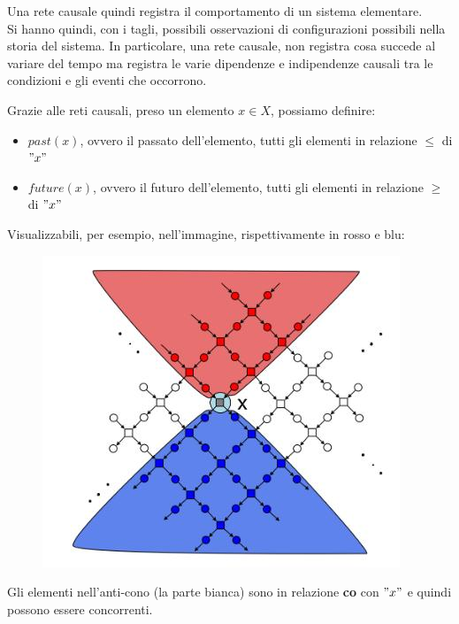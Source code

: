 Una rete causale quindi registra il comportamento di un sistema elementare.\\
Si hanno quindi, con i tagli, possibili osservazioni di configurazioni possibili
nella storia del sistema. In particolare, una rete causale, non registra cosa succede al variare del tempo ma registra le varie dipendenze e indipendenze causali tra le condizioni e gli eventi che occorrono.
\begin{definizione}
  Grazie alle reti causali, preso un elemento $x\in X$, possiamo definire:
  \begin{itemize}
    \item $past(x)$, ovvero il passato dell'elemento, tutti gli elementi in
    relazione $\leq$ di $"x"$
    \item $future(x)$, ovvero il futuro dell'elemento, tutti gli elementi in
    relazione $\geq$ di $"x"$
  \end{itemize}
  Visualizzabili, per esempio, nell'immagine, rispettivamente in rosso e blu:
  \begin{figure}[H]
    \centering
    \includegraphics[scale = 0.5]{img/pf.jpg} 
  \end{figure}
  Gli elementi nell'anti-cono (la parte bianca) sono in relazione \textbf{co}
  con $"x"$ e quindi possono essere concorrenti.
\end{definizione} \vspace{5mm} %
